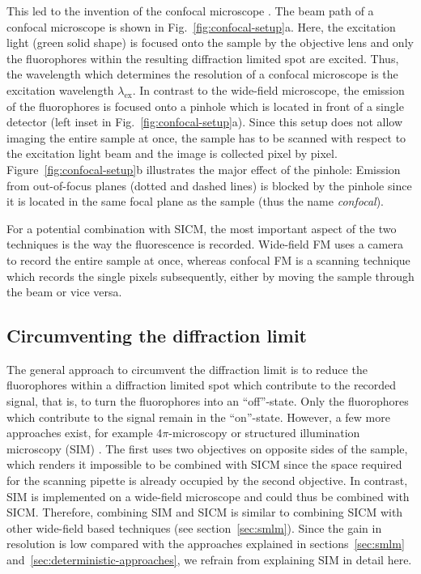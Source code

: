This led to the invention of the confocal microscope
\cite{Heimstaedt1911,Minsky1988}. The beam path of a confocal microscope is
shown in Fig.~\ref{fig:confocal-setup}a. Here, the excitation light (green solid
shape) is focused onto the sample by the objective lens and only the
fluorophores within the resulting diffraction limited spot are excited. Thus, the
wavelength which determines the resolution of a confocal microscope is the
excitation wavelength $\lambda_\text{ex}$. In contrast to the wide-field
microscope, the emission of the fluorophores is focused onto a pinhole which
is located in front of a single detector (left inset in
Fig.~\ref{fig:confocal-setup}a). Since this setup does not allow imaging the entire
sample at once, the sample has to be scanned with respect to the excitation
light beam and the image is collected pixel by
pixel. Figure~\ref{fig:confocal-setup}b illustrates the major effect of the pinhole:
Emission from out-of-focus planes (dotted and dashed lines) is blocked by the
pinhole since it is located in the same focal plane as the sample (thus the
name \emph{confocal}). 

For a potential combination with SICM, the most important aspect of the two
techniques is the way the fluorescence is recorded. Wide-field FM uses a 
camera to record the entire sample at once, whereas confocal FM is a scanning
technique which records the single pixels subsequently, either by moving the
sample through the beam or vice versa.

\subsection{Circumventing the diffraction limit}
\label{sec:circumvent-diffraction-limit}
The general approach to circumvent the diffraction limit is to reduce the
fluorophores within a diffraction limited spot which contribute to the
recorded signal, that is, to turn the fluorophores into an ``off''-state. Only
the fluorophores which contribute to the signal remain in the ``on''-state.
However, a few more approaches exist, for example 4$\pi$-microscopy
\cite{Hell1994} or structured illumination microscopy (SIM)
\cite{Guerra1995}. The first uses two objectives on opposite sides of the
sample, which renders it impossible to be combined with SICM since the space
required for the scanning pipette is already occupied by the second
objective. In contrast, SIM is implemented on a wide-field microscope and
could thus be combined with SICM. Therefore, combining SIM and SICM is similar
to combining SICM with other wide-field based techniques (see
section~\ref{sec:smlm}). Since the gain in resolution is low compared with the
approaches explained in sections~\ref{sec:smlm}
and~\ref{sec:deterministic-approaches}, we refrain from explaining SIM in
detail here.


